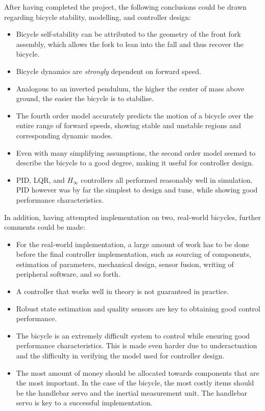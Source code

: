 After having completed the project, the following conclusions could be drawn regarding bicycle stability, modelling, and controller design:

\begin{itemize}
\item{Bicycle self-stability can be attributed to the geometry of the front fork assembly, which allows the fork to lean into the fall and thus recover the bicycle.}
\item{Bicycle dynamics are \textit{strongly} dependent on forward speed.}
\item{Analogous to an inverted pendulum, the higher the center of mass above ground, the easier the bicycle is to stabilise.}
\item{The fourth order model accurately predicts the motion of a bicycle over the entire range of forward speeds, showing stable and unstable regions and corresponding dynamic modes.}
\item{Even with many simplifying assumptions, the second order model seemed to describe the bicycle to a good degree, making it useful for controller design.}
\item{PID, LQR, and $H_{\infty}$ controllers all performed reasonably well in simulation. PID however was by far the simplest to design and tune, while showing good performance characteristics.}
\end{itemize}

In addition, having attempted implementation on two, real-world bicycles, further comments could be made:

\begin{itemize}
\item{For the real-world implementation, a large amount of work has to be done before the final controller implementation, such as sourcing of components, estimation of parameters, mechanical design, sensor fusion, writing of peripheral software, and so forth.}
\item{A controller that works well in theory is not guaranteed in practice.}
\item{Robust state estimation and quality sensors are key to obtaining good control performance.}
\item{The bicycle is an extremely difficult system to control while ensuring good performance characteristics. This is made even harder due to underactuation and the difficulty in verifying the model used for controller design.}
\item{The most amount of money should be allocated towards components that are the most important. In the case of the bicycle, the most costly items should be the handlebar servo and the inertial measurement unit. The handlebar servo is key to a successful implementation.}
\end{itemize}


